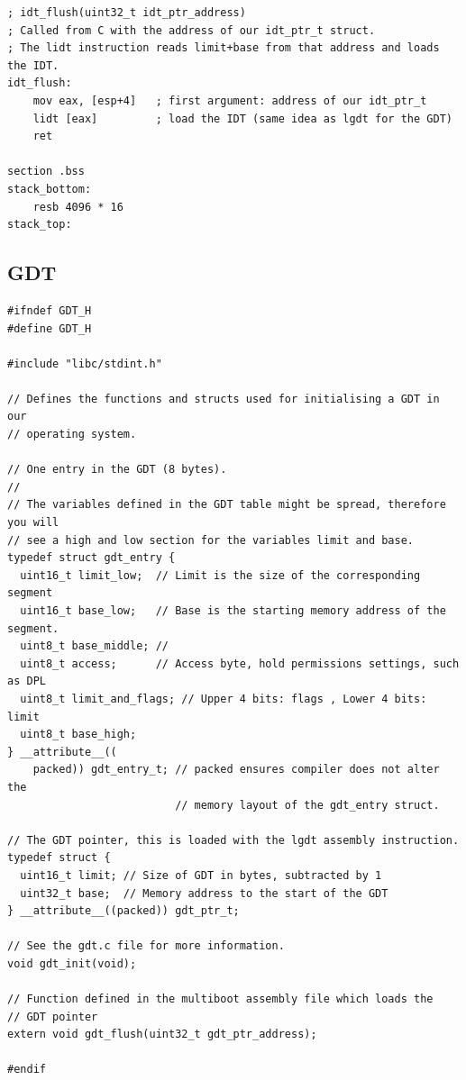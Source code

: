 \documentclass[../main.tex]{subfiles}
\begin{document}
\begin{verbatim}
; idt_flush(uint32_t idt_ptr_address)
; Called from C with the address of our idt_ptr_t struct.
; The lidt instruction reads limit+base from that address and loads the IDT.
idt_flush:
    mov eax, [esp+4]   ; first argument: address of our idt_ptr_t
    lidt [eax]         ; load the IDT (same idea as lgdt for the GDT)
    ret

section .bss
stack_bottom:
    resb 4096 * 16
stack_top:

\end{verbatim}


\subsection{GDT}
\label{apx:gdt}


\label{lst:gdt_h}
\begin{verbatim}
#ifndef GDT_H
#define GDT_H

#include "libc/stdint.h"

// Defines the functions and structs used for initialising a GDT in our
// operating system.

// One entry in the GDT (8 bytes).
//
// The variables defined in the GDT table might be spread, therefore you will
// see a high and low section for the variables limit and base.
typedef struct gdt_entry {
  uint16_t limit_low;  // Limit is the size of the corresponding segment
  uint16_t base_low;   // Base is the starting memory address of the segment.
  uint8_t base_middle; //
  uint8_t access;      // Access byte, hold permissions settings, such as DPL
  uint8_t limit_and_flags; // Upper 4 bits: flags , Lower 4 bits: limit
  uint8_t base_high;
} __attribute__((
    packed)) gdt_entry_t; // packed ensures compiler does not alter the
                          // memory layout of the gdt_entry struct.

// The GDT pointer, this is loaded with the lgdt assembly instruction.
typedef struct {
  uint16_t limit; // Size of GDT in bytes, subtracted by 1
  uint32_t base;  // Memory address to the start of the GDT
} __attribute__((packed)) gdt_ptr_t;

// See the gdt.c file for more information.
void gdt_init(void);

// Function defined in the multiboot assembly file which loads the
// GDT pointer
extern void gdt_flush(uint32_t gdt_ptr_address);

#endif

\end{verbatim}
\end{document}
